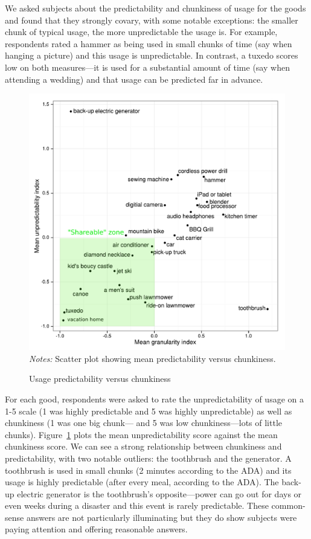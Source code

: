 \documentclass[11pt]{article}
\begin{document}
We asked subjects about the predictability and chunkiness of usage for the goods and found that they strongly covary, with some notable exceptions:
the smaller chunk of typical usage, the more unpredictable the usage is.
For example, respondents rated a hammer as being used in small chunks of time (say when hanging a picture) and this usage is unpredictable. 
In contrast, a tuxedo scores low on both measures---it is used for a substantial amount of time (say when attending a wedding) and that usage can be predicted far in advance.  

\begin{figure}
\centering 
\caption{Usage predictability versus chunkiness \label{fig:granularity_v_predictability}}
\begin{minipage}{0.60 \linewidth}
\includegraphics[width = \linewidth]{./plots/granularity_versus_predictability.pdf} 
\emph{Notes:} Scatter plot showing mean predictability versus chunkiness. 
\end{minipage} 
\end{figure} 

For each good, respondents were asked to rate the unpredictability of usage on a 1-5 scale (1 was highly predictable and 5 was highly unpredictable) as well as chunkiness (1 was one big chunk--- and 5 was low chunkiness---lots of little chunks).  
Figure~\ref{fig:granularity_v_predictability} plots the mean unpredictability score against the mean chunkiness score. 
We can see a strong relationship between chunkiness and predictability, with two notable outliers: the toothbrush and the generator. 
A toothbrush is used in small chunks (2 minutes according to the ADA) and its usage is highly predictable (after every meal, according to the ADA).
The back-up electric generator is the toothbrush's opposite---power can go out for days or even weeks during a disaster and this event is rarely predictable. 
These common-sense answers are not particularly illuminating but they do show subjects were paying attention and offering reasonable answers. 
\end{document}
